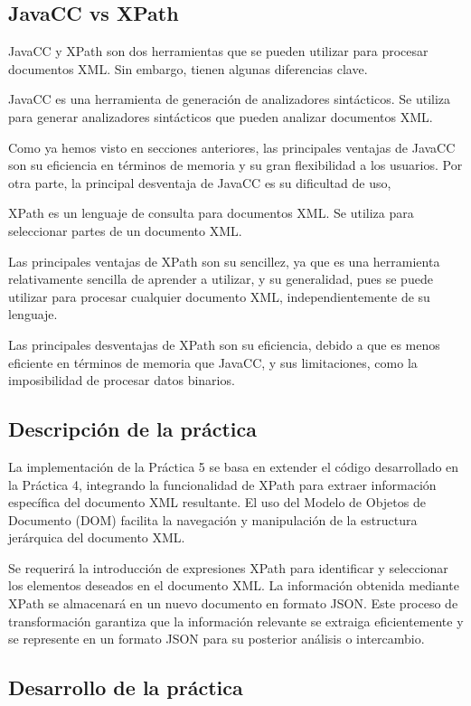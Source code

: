 \subsection{JavaCC vs XPath}

JavaCC y XPath son dos herramientas que se pueden utilizar para procesar documentos XML. Sin embargo, tienen algunas diferencias clave.

JavaCC es una herramienta de generación de analizadores sintácticos. Se utiliza para generar analizadores sintácticos que pueden analizar documentos XML.

Como ya hemos visto en secciones anteriores, las principales ventajas de JavaCC son su eficiencia en términos de memoria y su gran flexibilidad a los usuarios. Por otra parte, la principal desventaja de JavaCC es su dificultad de uso, 

XPath es un lenguaje de consulta para documentos XML. Se utiliza para seleccionar partes de un documento XML.

Las principales ventajas de XPath son su sencillez, ya que es una herramienta relativamente sencilla de aprender a utilizar, y su generalidad, pues se puede utilizar para procesar cualquier documento XML, independientemente de su lenguaje.

Las principales desventajas de XPath son su eficiencia, debido a que es menos eficiente en términos de memoria que JavaCC, y sus limitaciones, como la imposibilidad de procesar datos binarios.


\subsection{Descripción de la práctica}

La implementación de la Práctica 5 se basa en extender el código desarrollado en la Práctica 4, integrando la funcionalidad de XPath para extraer información específica del documento XML resultante. El uso del Modelo de Objetos de Documento (DOM) facilita la navegación y manipulación de la estructura jerárquica del documento XML.

Se requerirá la introducción de expresiones XPath para identificar y seleccionar los elementos deseados en el documento XML. La información obtenida mediante XPath se almacenará en un nuevo documento en formato JSON. Este proceso de transformación garantiza que la información relevante se extraiga eficientemente y se represente en un formato JSON para su posterior análisis o intercambio.

\subsection{Desarrollo de la práctica}

